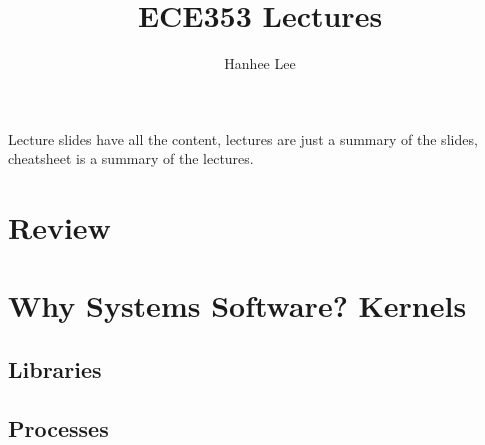 \documentclass{article}
\title{ECE353 Lectures}
\author{Hanhee Lee}
\begin{document}
\maketitle

\tableofcontents

\begin{summary}
    Lecture slides have all the content, lectures are just a summary of the slides, cheatsheet is a summary of the lectures.
\end{summary}
\newpage

\section{Review}


\newpage

\section{Why Systems Software? Kernels}


\newpage

\begin{center}
    \section{Libraries}
\end{center}


\newpage

\begin{center}
    \section{Processes}
\end{center}

\end{document}
